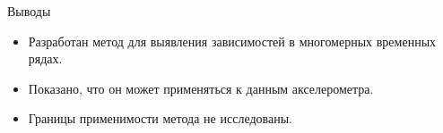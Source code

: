 \documentclass{beamer}
\begin{document}
	
	\begin{frame}{Выводы}
		\begin{itemize}
			\item Разработан метод для выявления зависимостей в многомерных временных рядах.
			\item Показано, что он может применяться к данным акселерометра.
			\item Границы применимости метода не исследованы.
		\end{itemize}
	\end{frame}
	
\end{document}
